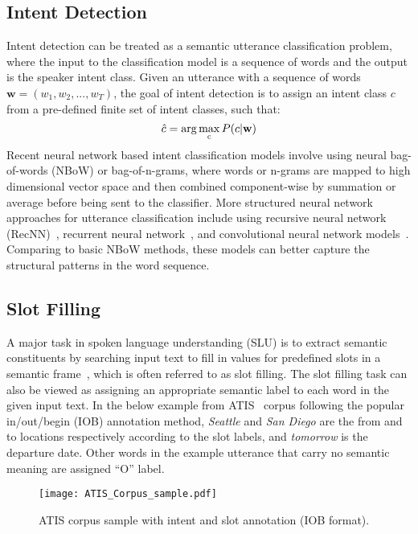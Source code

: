 \documentclass[11pt]{article}
\begin{document}
\subsection{Intent Detection}
    Intent detection can be treated as a semantic utterance classification problem, where the input to the classification model is a sequence of words and the output is the speaker intent class. Given an utterance with a sequence of words $\mathbf{w}=(w_1, w_2, ..., w_T)$, the goal of intent detection is to assign an intent class $c$ from a pre-defined finite set of intent classes, such that:
        \begin{equation}
            \hat{c} = \operatorname{\arg\max_c} P(c|\mathbf{w}) \\
        \end{equation}
Recent neural network based intent classification models involve using neural bag-of-words (NBoW) or bag-of-n-grams, where words or n-grams are mapped to high dimensional vector space and then combined component-wise by summation or average before being sent to the classifier. More structured neural network approaches for utterance classification include using recursive neural network (RecNN)~\cite{guo:14}, recurrent neural network~\cite{ravuri:15}, and convolutional neural network models~\cite{collobert:08,kim:14}. Comparing to basic NBoW methods, these models can better capture the structural patterns in the word sequence.

\subsection{Slot Filling}
    A major task in spoken language understanding (SLU) is to extract semantic constituents by searching input text to fill in values for predefined slots in a semantic frame~\cite{mesnil:15}, which is often referred to as slot filling. The slot filling task can also be viewed as assigning an appropriate semantic label to each word in the given input text. In the below example from ATIS~\cite{hemphill:90} corpus following the popular in/out/begin (IOB) annotation method, \textit{Seattle} and \textit{San Diego} are the from and to locations respectively according to the slot labels, and \textit{tomorrow} is the departure date. Other words in the example utterance that carry no semantic meaning are assigned ``O'' label. 
    
    \begin{figure}[h]
        \centering
        \texttt{[image: ATIS\_Corpus\_sample.pdf]}
        \caption{{ATIS corpus sample with intent and slot annotation (IOB format). }}
        \label{fig:slot_filling_example.pdf}
    \end{figure}
    
\end{document}
